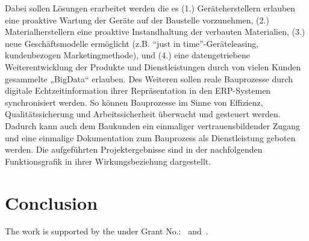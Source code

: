 Dabei sollen Lösungen erarbeitet werden die es (1.) Geräteherstellern erlauben eine proaktive Wartung der Geräte auf der Baustelle vorzunehmen, (2.) Materialherstellern eine proaktive Instandhaltung der verbauten Materialien, (3.) neue Geschäftsmodelle ermöglicht (z.B. “just in time”-Geräteleasing, kundenbezogen Marketingmethode), und (4.) eine datengetriebene Weiterentwicklung der Produkte und Dienstleistungen durch von vielen Kunden gesammelte „BigData“ erlauben. Des Weiteren sollen reale Bauprozesse durch digitale Echtzeitinformation ihrer Repräsentation in den ERP-Systemen synchronisiert werden. So können Bauprozesse im Sinne von Effizienz, Qualitätssicherung und Arbeitssicherheit überwacht und gesteuert werden. Dadurch kann auch dem Baukunden ein einmaliger vertrauensbildender Zugang und eine einmalige Dokumentation zum Bauprozess als Dienstleistung geboten werden.
Die aufgeführten Projektergebnisse sind in der nachfolgenden Funktionsgrafik in ihrer Wirkungsbeziehung dargestellt.


\section{Conclusion}


\begin{acks}
  
  The work is
  supported by the  under Grant
  No.:~
  and~.

\end{acks}
